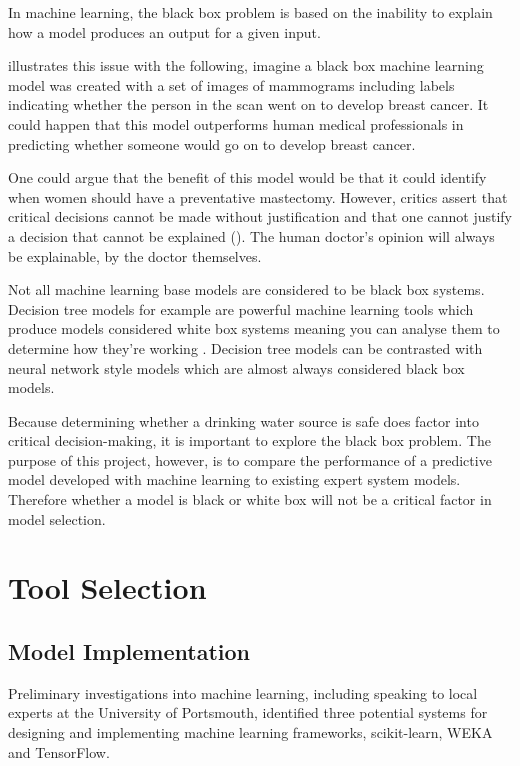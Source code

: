 In machine learning, the black box problem is based on the inability to explain how a model produces an output for a given input.

\cite{Castelvecchi2016} illustrates this issue with the following, imagine a black box machine learning model was created with a set of images of mammograms including labels indicating whether the person in the scan went on to develop breast cancer. It could happen that this model outperforms human medical professionals in predicting whether someone would go on to develop breast cancer.

One could argue that the benefit of this model would be that it could identify when women should have a preventative mastectomy. However, critics assert that critical decisions cannot be made without justification and that one cannot justify a decision that cannot be explained (\cite{Loyola-Gonzalez2019}). The human doctor's opinion will always be explainable, by the doctor themselves.

Not all machine learning base models are considered to be black box systems. Decision tree models for example are powerful machine learning tools which produce models considered white box systems meaning you can analyse them to determine how they're working \parencite{Caruana2006}. Decision tree models can be contrasted with neural network style models which are almost always considered black box models.

Because determining whether a drinking water source is safe does factor into critical decision-making, it is important to explore the black box problem. The purpose of this project, however, is to compare the performance of a predictive model developed with machine learning to existing expert system models. Therefore whether a model is black or white box will not be a critical factor in model selection.

\section{Tool Selection}

\subsection{Model Implementation}

Preliminary investigations into machine learning, including speaking to local experts at the University of Portsmouth, identified three potential systems for designing and implementing machine learning frameworks, scikit-learn, WEKA and TensorFlow.

